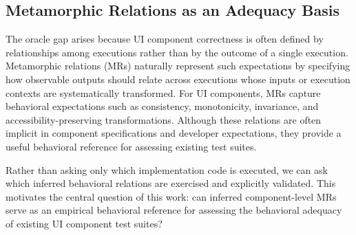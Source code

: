 
\subsection{Metamorphic Relations as an Adequacy Basis}\label{sec:background:mt}

The oracle gap arises because UI component correctness is often defined by relationships among executions rather than by the outcome of a single execution. Metamorphic relations (MRs) naturally represent such expectations by specifying how observable outputs should relate across executions whose inputs or execution contexts are systematically transformed.
For UI components, MRs capture behavioral expectations such as consistency, monotonicity, invariance, and accessibility-preserving transformations. Although these relations are often implicit in component specifications and developer expectations, they provide a useful behavioral reference for assessing existing test suites.

Rather than asking only which implementation code is executed, we can ask which inferred behavioral relations are exercised and explicitly validated. This motivates the central question of this work: can inferred component-level MRs serve as an empirical behavioral reference for assessing the behavioral adequacy of existing UI component test suites?